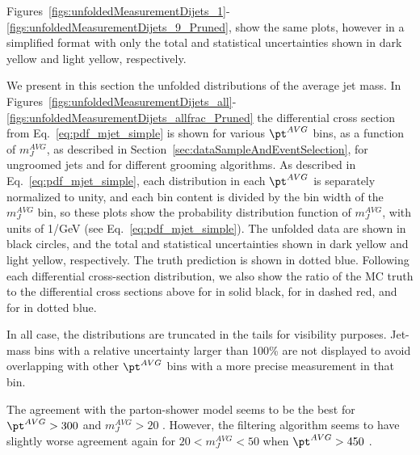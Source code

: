 Figures~\ref{figs:unfoldedMeasurementDijets_1}-
\ref{figs:unfoldedMeasurementDijets_9_Pruned}, 
show the same plots, however in a simplified format with only the
total and statistical uncertainties shown in dark yellow and 
light yellow, respectively. 
\fi

\ifpas

We present in this section the unfolded distributions of the 
average jet mass.
In Figures~\ref{figs:unfoldedMeasurementDijets_all}-
\ref{figs:unfoldedMeasurementDijets_allfrac_Pruned}
the differential cross
section from Eq.~\ref{eq:pdf_mjet_simple} is shown for
various $\pt^{AVG}$ bins, as a function of
$m_{J}^{AVG}$, as described in
Section~\ref{sec:dataSampleAndEventSelection}, 
for ungroomed jets and for different grooming algorithms. 
As described in Eq.~\ref{eq:pdf_mjet_simple},
each distribution in each $\pt^{AVG}$ is separately normalized to
unity, and each bin content is divided by the bin width of the
$m_J^{AVG}$ bin,
so these plots show the probability distribution function of $m_J^{AVG}$,
with units of 1/GeV (see Eq.~\ref{eq:pdf_mjet_simple}). 
The unfolded data are shown in
black circles, and the 
total and statistical uncertainties shown in dark yellow and 
light yellow, respectively. The \HERWIG truth prediction is shown in
dotted blue. 
Following each differential cross-section distribution, we also show
the ratio of the MC truth to the differential cross
sections above for \PYTHIA in solid black, 
for \PYTHIAEIGHT in dashed red, and for \HERWIG in dotted blue. 

\fi 

In all case, the distributions are truncated in the tails for
visibility purposes. Jet-mass bins with a relative uncertainty larger
than 100\% are not displayed to avoid overlapping with other
$\pt^{AVG}$ bins with a more precise measurement in that bin. 

The agreement with the \HERWIG parton-shower model seems to be the
best for $\pt^{AVG} > 300$ \GeV and $m_{J}^{AVG} > 20$ \GeV.
However, the filtering algorithm seems to have slightly worse agreement again 
for $20 < m_{J}^{AVG} < 50$ \GeV when $\pt^{AVG} > 450$ \GeV.

